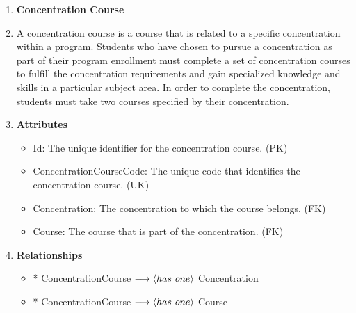 \documentclass[12pt]{article}
\begin{document}
\begin{appendices}
\begin{enumerate}[label=(\roman*)]
    \item \textbf{Concentration Course}
    \item[] A concentration course is a course that is related to a specific concentration within a program. Students who have chosen to pursue a concentration as part of their program enrollment must complete a set of concentration courses to fulfill the concentration requirements and gain specialized knowledge and skills in a particular subject area. In order to complete the concentration, students must take two courses specified by their concentration.
    \item[] \textbf{Attributes}
    \begin{itemize}
        \item Id: The unique identifier for the concentration course. (PK)
        \item ConcentrationCourseCode: The unique code that identifies the concentration course. (UK)
        \item Concentration: The concentration to which the course belongs. (FK)
        \item Course: The course that is part of the concentration. (FK)
    \end{itemize}
    \item[] \textbf{Relationships}
    \begin{itemize}
        \item * ConcentrationCourse $ \longrightarrow \langle has \hspace{0.125cm} one \rangle $ Concentration
        \item * ConcentrationCourse $ \longrightarrow \langle has \hspace{0.125cm} one \rangle $ Course
    \end{itemize}


\end{enumerate}
\end{appendices}
\end{document}
